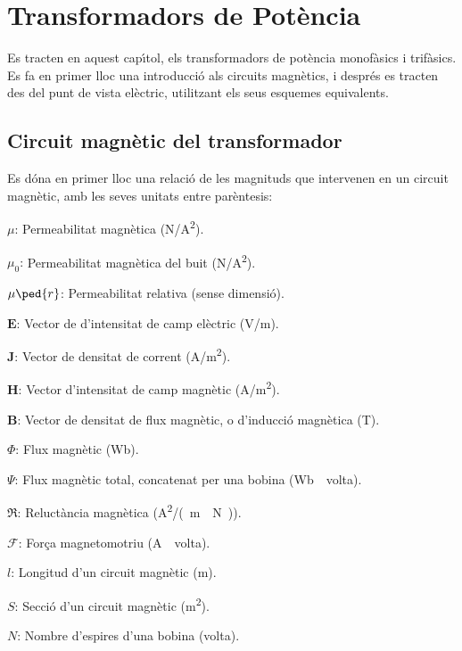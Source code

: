 \chapter{Transformadors de Pot\`{e}ncia}

Es tracten en aquest cap\'{\i}tol, els transformadors de pot\`{e}ncia
monof\`{a}sics i trif\`{a}sics. Es fa en primer lloc una introducci\'{o} als
circuits magn\`{e}tics, i despr\'{e}s es tracten des del  punt de vista
el\`{e}ctric, utilitzant els seus esquemes equivalents.

\section{Circuit magn\`{e}tic del transformador}

Es d\'{o}na en primer lloc una relaci\'{o} de les magnituds que intervenen
en un circuit magn\`{e}tic, amb les seves unitats entre par\`{e}ntesis:
\begin{list}{}
{\setlength{\labelwidth}{10mm}
\setlength{\leftmargin}{12mm}\setlength{\labelsep}{2mm}}
   \item[$\mu$:] Permeabilitat magn\`{e}tica (\unit{N/A^2}).
   \item[$\mu_0$:] Permeabilitat magn\`{e}tica del buit (\unit{N/A^2}).
   \item[$\mu\ped{r}$:] Permeabilitat relativa (sense dimensi\'{o}).
   \item[$\boldsymbol{E}$:] Vector de d'intensitat de camp el\`{e}ctric  (\unit{V/m}).
   \item[$\boldsymbol{J}$:] Vector de densitat de corrent  (\unit{A/m^2}).
   \item[$\boldsymbol{H}$:] Vector d'intensitat de camp magn\`{e}tic  (\unit{A/m^2}).
   \item[$\boldsymbol{B}$:] Vector de densitat de flux magn\`{e}tic, o d'inducci\'{o} magn\`{e}tica  (\unit{T}).
   \item[$\Phi$:] Flux magn\`{e}tic  (\unit{Wb}).
   \item[$\Psi$:] Flux magn\`{e}tic  total, concatenat per una bobina (\unit{Wb\cdot volta}).
   \item[$\mathfrak{R}$:] Reluct\`{a}ncia magn\`{e}tica (\unit{A^2/(m\cdot N)}).
   \item[$\mathscr{F}$:] For\c{c}a magnetomotriu (\unit{A\cdot volta}).
   \item[$l$:] Longitud d'un circuit magn\`{e}tic (\unit{m}).
   \item[$S$:] Secci\'{o} d'un circuit magn\`{e}tic (\unit{m^2}).
   \item[$N$:] Nombre d'espires d'una bobina (volta).
\end{list}

